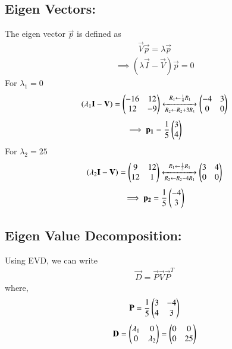 \documentclass[journal,12pt,twocolumn]{IEEEtran}
\begin{document}
\subsection{Eigen Vectors:}
The eigen vector $\vec{p}$ is defined as
\begin{align}
\vec{V}\vec{p}=\lambda\vec{p}     
\end{align}
\begin{align}
\implies (\lambda \vec{I} - \vec{V} ) \vec{p} = 0
\end{align}
For $\lambda_1 = 0 $
\begin{align}
(\lambda_1 \mathbf{I}-\mathbf{V} ) = \begin{pmatrix}-16 & 12 \\ 12 & -9 \end{pmatrix}\xleftrightarrow[R_2\leftarrow R_2+3R_1]{R_1\leftarrow \frac{1}{4}R_1}\begin{pmatrix}-4 & 3\\0 & 0\end{pmatrix}
\end{align}
\begin{align}
\implies \mathbf{p_1} = \frac{1}{5} \begin{pmatrix}3 \\ 4\end{pmatrix} \label{eq:p1val}
\end{align}
For $\lambda_2 = 25$
\begin{align}
(\lambda_2 \mathbf{I}-\mathbf{V} ) = \begin{pmatrix}9 & 12 \\ 12 & 1\end{pmatrix}\xleftrightarrow[R_2\leftarrow R_2-4R_1]{R_1\leftarrow \frac{1}{3}R_1}\begin{pmatrix}3 & 4\\0 & 0\end{pmatrix}
\end{align}
\begin{align}
\implies \mathbf{p_2} = \frac{1}{5} \begin{pmatrix}-4\\ 3\end{pmatrix} \label{eq:p2val}
\end{align}
\subsection{Eigen Value Decomposition:}
Using EVD, we can write 
\begin{align}
 \vec{D} = \vec{P} \vec{V} \vec{P}^T
\end{align}
where,
\begin{align}
 \mathbf{P} = \frac{1}{5} \begin{pmatrix}3 & -4 \\ 4 & 3\end{pmatrix}
\end{align}
\begin{align}
 \mathbf{D} = \begin{pmatrix}\lambda_1 & 0 \\ 0 & \lambda_2\end{pmatrix} = \begin{pmatrix}0 & 0 \\ 0 & 25\end{pmatrix}
\end{align}
\end{document}
